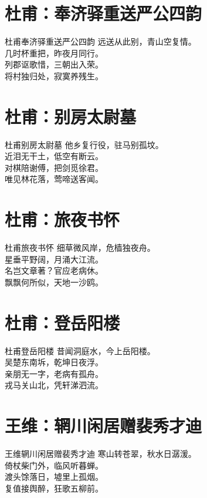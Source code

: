 \documentclass[12pt,oneside,a5paper]{book}
\begin{document}
\chapter{杜甫：奉济驿重送严公四韵}
\begin{poemzh}{杜甫}{奉济驿重送严公四韵}
远送从此别，青山空复情。\\
几时杯重把，昨夜月同行。\\
列郡讴歌惜，三朝出入荣。\\
将村独归处，寂寞养残生。\\ 
\end{poemzh}

\chapter{杜甫：别房太尉墓}
\begin{poemzh}{杜甫}{别房太尉墓}
他乡复行役，驻马别孤坟。\\
近泪无干土，低空有断云。\\
对棋陪谢傅，把剑觅徐君。\\
唯见林花落，莺啼送客闻。\\ 
\end{poemzh}

\chapter{杜甫：旅夜书怀}
\begin{poemzh}{杜甫}{旅夜书怀}
细草微风岸，危樯独夜舟。\\
星垂平野阔，月涌大江流。\\
名岂文章著？官应老病休。\\
飘飘何所似，天地一沙鸥。\\ 
\end{poemzh}

\chapter{杜甫：登岳阳楼}
\begin{poemzh}{杜甫}{登岳阳楼}
昔闻洞庭水，今上岳阳楼。\\
吴楚东南坼，乾坤日夜浮。\\
亲朋无一字，老病有孤舟。\\
戎马关山北，凭轩涕泗流。\\ 
\end{poemzh}

\chapter{王维：辋川闲居赠裴秀才迪}
\begin{poemzh}{王维}{辋川闲居赠裴秀才迪}
寒山转苍翠，秋水日潺湲。\\
倚杖柴门外，临风听暮蝉。\\
渡头馀落日，墟里上孤烟。\\
复值接舆醉，狂歌五柳前。\\ 
\end{poemzh}
\end{document}
